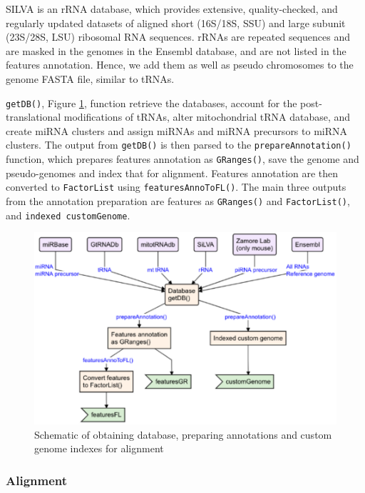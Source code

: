 \documentclass[12pt,twoside]{reedthesis}
\begin{document}
SILVA is an rRNA database, which provides extensive, quality-checked,
and regularly updated datasets of aligned short (16S/18S, SSU) and large
subunit (23S/28S, LSU) ribosomal RNA sequences. rRNAs are repeated
sequences and are masked in the genomes in the Ensembl database, and are
not listed in the features annotation. Hence, we add them as well as
pseudo chromosomes to the genome FASTA file, similar to tRNAs.

\texttt{getDB()}, Figure \ref{fig:3f6}, function retrieve the databases,
account for the post-translational modifications of tRNAs, alter
mitochondrial tRNA database, and create miRNA clusters and assign miRNAs
and miRNA precursors to miRNA clusters. The output from \texttt{getDB()} is
then parsed to the \texttt{prepareAnnotation()} function, which prepares
features annotation as \texttt{GRanges()}, save the genome and pseudo-genomes
and index that for alignment. Features annotation are then converted to
\texttt{FactorList} using \texttt{featuresAnnoToFL()}. The main three outputs from the
annotation preparation are features as \texttt{GRanges()} and \texttt{FactorList()},
and \texttt{indexed\ customGenome}.



\begin{figure}[htbp]

{\centering \includegraphics{thesis_files/figure-latex/3f6-1} 

}

\caption{Schematic of obtaining database, preparing annotations and
custom genome indexes for alignment}\label{fig:3f6}
\end{figure}
\hypertarget{alignment}{%
\subsubsection{Alignment}\label{alignment}}
\end{document}
